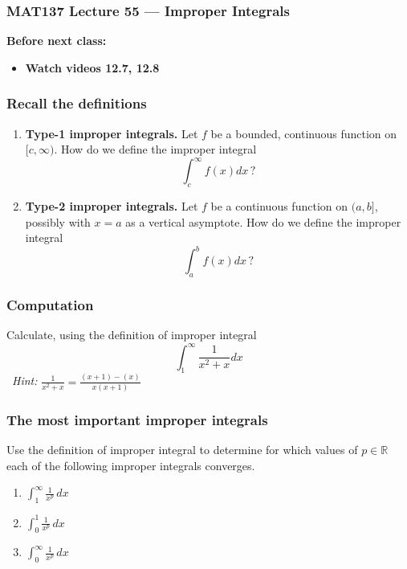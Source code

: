 \documentclass[14pt]{beamer}
\date{}
\title{}
\author{}
\newcommand{\R}{\mathbb{R}}
\begin{document}
\begin{frame}
	\frametitle{MAT137 Lecture 55 --- Improper Integrals}

	\vfill
	{\bf Before next class:}
		\begin{itemize} \normalsize
			\item {\bf Watch videos 12.7, 12.8 }
		\end{itemize}
\end{frame}
	\begin{frame}[t]
		\frametitle{Recall the definitions}

		\begin{enumerate}
			\item {\bf Type-1 improper integrals.} Let $f$ be a bounded, continuous
				function on ${\displaystyle [c, \infty)}$. How do we define the improper
				integral
				\[
					\int_{c}^{\infty}f(x) dx \, ?
				\]

				\vfill

			\item {\bf Type-2 improper integrals.} Let $f$ be a continuous function on
				${\displaystyle (a,b]}$, possibly with $x=a$ as a vertical asymptote. How
				do we define the improper integral
				\[
					\int_{a}^{b}f(x) dx \, ?
				\]

				\vfill
		\end{enumerate}
	\end{frame}
	\begin{frame}[t]
		\frametitle{Computation}

		Calculate, using the definition of improper integral
		\[
			\int_{1}^{\infty}\frac{1}{x^{2}+x}dx
		\]
		\
 \emph{Hint:}
		${\displaystyle \frac{1}{x^{2}+x} = \frac{(x+1) - (x)}{x(x+1)}}$
	\end{frame}
	\begin{frame}[t]
		\frametitle{The most important improper integrals}

		Use the definition of improper integral to determine for which values of
		${\displaystyle p \in \R}$ each of the following improper integrals
		converges.

		\begin{enumerate}
			\item ${\displaystyle \int_1^{\infty} \frac{1}{x^{p}} \, dx }$
				\vfill

			\item ${\displaystyle \int_0^1 \frac{1}{x^{p}} \, dx }$
				\vfill

			\item ${\displaystyle \int_0^{\infty} \frac{1}{x^{p}} \, dx }$
				\vfill
		\end{enumerate}
	\end{frame}
\end{document}
